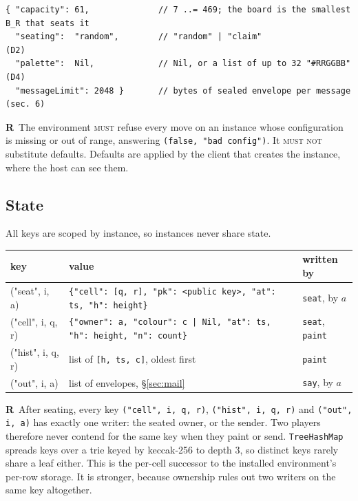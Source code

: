 \documentclass[11pt,a4paper]{article}
\newcommand{\code}[1]{\texttt{#1}}
\newcommand{\MUST}{\textsc{must}}
\newcommand{\MUSTNOT}{\textsc{must not}}
\newcounter{req}
\newcommand{\req}[1]{\refstepcounter{req}\label{#1}\textbf{R\thereq}}
\begin{document}
\begin{lstlisting}[language=rholang]
{ "capacity": 61,              // 7 ..= 469; the board is the smallest B_R that seats it
  "seating":  "random",        // "random" | "claim"                          (D2)
  "palette":  Nil,             // Nil, or a list of up to 32 "#RRGGBB"         (D4)
  "messageLimit": 2048 }       // bytes of sealed envelope per message      (sec. 6)
\end{lstlisting}

\req{r:config}~The environment \MUST{} refuse every move on an instance whose configuration is
missing or out of range, answering \code{(false, "bad config")}. It \MUSTNOT{} substitute defaults.
Defaults are applied by the client that creates the instance, where the host can see them.

\subsection{State}

All keys are scoped by instance, so instances never share state.

\begin{center}\small
\begin{tabularx}{\linewidth}{@{}>{\ttfamily}l X l@{}}
\toprule
\normalfont key & value & written by\\
\midrule
("seat", i, a)    & \code{\{"cell": [q, r], "pk": <public key>, "at": ts, "h": height\}} & \code{seat}, by $a$\\
("cell", i, q, r) & \code{\{"owner": a, "colour": c | Nil, "at": ts, "h": height, "n": count\}} & \code{seat}, \code{paint}\\
("hist", i, q, r) & list of \code{[h, ts, c]}, oldest first & \code{paint}\\
("out", i, a)     & list of envelopes, \S\ref{sec:mail} & \code{say}, by $a$\\
\bottomrule
\end{tabularx}
\end{center}

\req{r:single-writer}~After seating, every key \code{("cell", i, q, r)}, \code{("hist", i, q, r)}
and \code{("out", i, a)} has exactly one writer: the seated owner, or the sender. Two players
therefore never contend for the same key when they paint or send. \code{TreeHashMap} spreads
keys over a trie keyed by keccak-256 to depth 3, so distinct keys rarely share a leaf
either. This is the per-cell successor to the installed environment's per-row storage. It is
stronger, because ownership rules out two writers on the same key altogether.
\end{document}
